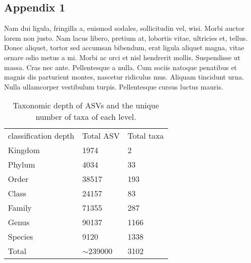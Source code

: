 \documentclass[unnumsec,webpdf,contemporary,large]{oup-authoring-template}%
\theoremstyle{thmstyleone}%
\theoremstyle{thmstyletwo}%
\theoremstyle{thmstylethree}%
\begin{document}

\begin{appendices}

\section{Appendix 1}\label{appendix1}

Nam dui ligula, fringilla a, euismod sodales, sollicitudin vel, wisi. Morbi auctor lorem non justo. Nam lacus libero,
pretium at, lobortis vitae, ultricies et, tellus. Donec aliquet, tortor sed accumsan bibendum, erat ligula aliquet magna,
vitae ornare odio metus a mi. Morbi ac orci et nisl hendrerit mollis. Suspendisse ut massa. Cras nec ante. Pellentesque
a nulla. Cum sociis natoque penatibus et magnis dis parturient montes, nascetur ridiculus mus. Aliquam tincidunt
urna. Nulla ullamcorper vestibulum turpis. Pellentesque cursus luctus mauris.

\begin{table}[]
    \caption{Taxonomic depth of ASVs and the unique number of taxa of each level.\label{table:asv_taxonomy}}%
\begin{tabular}{@{}lll@{}}
classification depth & Total ASV    & Total taxa \\
Kingdom              & 1974         & 2          \\
Phylum               & 4034         & 33         \\
Order                & 38517        & 193        \\
Class                & 24157        & 83         \\
Family               & 71355        & 287        \\
Genus                & 90137        & 1166       \\
Species              & 9120         & 1338       \\
Total                & $\sim$239000 & 3102      
\end{tabular}
\label{table:asv_taxonomy}
\end{table}

%
%
\end{appendices}
\end{document}
